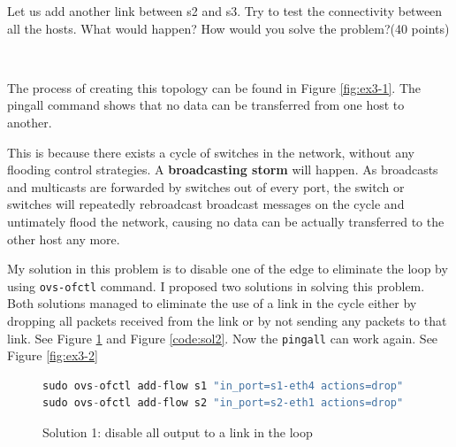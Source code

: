 \begin{exercise}[]{Let us add another link between s2 and s3. Try to test the connectivity between all the hosts. What would happen? How would you solve the problem?(40 points)}
  \begin{solution}
  \par{~}

  The process of creating this topology can be found in Figure \ref{fig:ex3-1}. The pingall command shows that no data can be transferred from one host to another.

  This is because there exists a cycle of switches in the network, without any flooding control strategies. A \textbf{broadcasting storm} will happen. As broadcasts and multicasts are forwarded by switches out of every port, the switch or switches will repeatedly rebroadcast broadcast messages on the cycle and untimately flood the network, causing no data can be actually transferred to the other host any more.

  My solution in this problem is to disable one of the edge to eliminate the loop by using \texttt{ovs-ofctl} command. I proposed two solutions in solving this problem. Both solutions managed to eliminate the use of a link in the cycle either by dropping all packets received from the link or by not sending any packets to that link. See Figure \ref{code:sol1} and Figure \ref{code:sol2}. Now the \texttt{pingall} can work again. See Figure \ref{fig:ex3-2}





  \end{solution}
  \label{ex3}
\end{exercise}



\begin{figure}[!h]
    \caption{Solution 1: disable all output to a link in the loop}
    \label{code:sol1}
\begin{lstlisting}[language=C,frame=single]
sudo ovs-ofctl add-flow s1 "in_port=s1-eth4 actions=drop"                    # s2 --x-> s1
sudo ovs-ofctl add-flow s2 "in_port=s2-eth1 actions=drop"                    # s1 --x-> s2
\end{lstlisting}
\end{figure}



